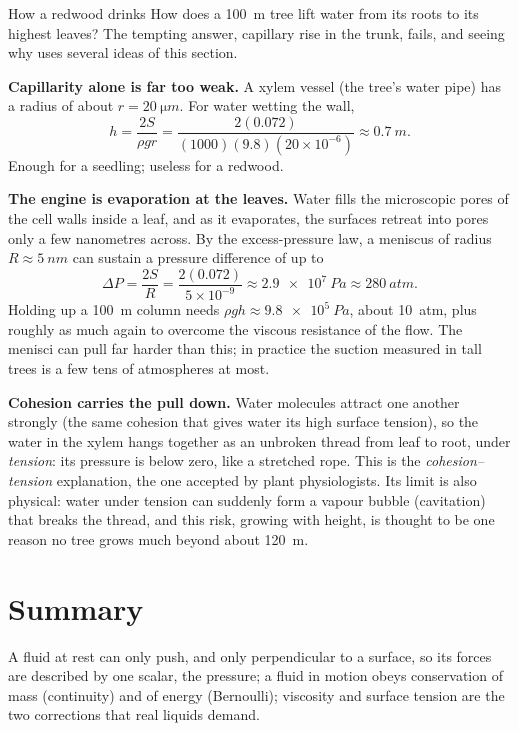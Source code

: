 \begin{remarkbox}{How a redwood drinks}
How does a \SI{100}{m} tree lift water from its roots to its highest leaves? The tempting answer, capillary
rise in the trunk, fails, and seeing why uses several ideas of this section.

\smallskip
\textbf{Capillarity alone is far too weak.} A xylem vessel (the tree's water pipe) has a radius of about
$r=\SI{20}{\micro m}$. For water wetting the wall,
\[
h=\frac{2S}{\rho gr}=\frac{2(0.072)}{(1000)(9.8)(20\times10^{-6})}\approx\SI{0.7}{m}.
\]
Enough for a seedling; useless for a redwood.

\smallskip
\textbf{The engine is evaporation at the leaves.} Water fills the microscopic pores of the cell walls inside
a leaf, and as it evaporates, the surfaces retreat into pores only a few nanometres across. By the
excess-pressure law, a meniscus of radius $R\approx\SI{5}{nm}$ can sustain a pressure difference of up to
\[
\Delta P=\frac{2S}{R}=\frac{2(0.072)}{5\times10^{-9}}\approx\SI{2.9e7}{Pa}\approx\SI{280}{atm}.
\]
Holding up a \SI{100}{m} column needs $\rho gh\approx\SI{9.8e5}{Pa}$, about \SI{10}{atm}, plus roughly as
much again to overcome the viscous resistance of the flow. The menisci can pull far harder than this; in
practice the suction measured in tall trees is a few tens of atmospheres at most.

\smallskip
\textbf{Cohesion carries the pull down.} Water molecules attract one another strongly (the same cohesion
that gives water its high surface tension), so the water in the xylem hangs together as an unbroken thread
from leaf to root, under \emph{tension}: its pressure is below zero, like a stretched rope. This is the
\emph{cohesion--tension} explanation, the one accepted by plant physiologists. Its limit is also physical:
water under tension can suddenly form a vapour bubble (cavitation) that breaks the thread, and this risk,
growing with height, is thought to be one reason no tree grows much beyond about \SI{120}{m}.
\end{remarkbox}

\section{Summary}\label{sec:fluids-summary}
A fluid at rest can only push, and only perpendicular to a surface, so its forces are described by one
scalar, the pressure; a fluid in motion obeys conservation of mass (continuity) and of energy (Bernoulli);
viscosity and surface tension are the two corrections that real liquids demand.

